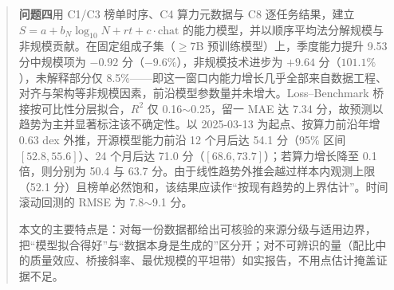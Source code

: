 \documentclass[bwprint]{gmcmthesis}
\begin{document}
\begin{abstract}
\textbf{问题四}用 C1/C3 榜单时序、C4 算力元数据与 C8 逐任务结果，建立 $S=a+b_N\log_{10}N+rt+c\cdot\text{chat}$ 的能力模型，并以顺序平均法分解规模与非规模贡献。在固定组成子集（$\ge$7B 预训练模型）上，季度能力提升 9.53 分中规模项为 $-0.92$ 分（$-9.6\%$），非规模技术进步为 $+9.64$ 分（$101.1\%$），未解释部分仅 8.5\%——即这一窗口内能力增长几乎全部来自数据工程、对齐与架构等非规模因素，前沿模型参数量并未增大。Loss--Benchmark 桥接按可比性分层拟合，$R^2$ 仅 0.16$\sim$0.25，留一 MAE 达 7.34 分，故预测以趋势为主并显著标注该不确定性。以 2025-03-13 为起点、按算力前沿年增 0.63 dex 外推，开源模型能力前沿 12 个月后达 54.1 分（95\% 区间 $[52.8,55.6]$）、24 个月后达 71.0 分（$[68.6,73.7]$）；若算力增长降至 0.1 倍，则分别为 50.4 与 63.7 分。由于线性趋势外推会越过样本内观测上限（52.1 分）且榜单必然饱和，该结果应读作``按现有趋势的上界估计''。时间滚动回测的 RMSE 为 7.8$\sim$9.1 分。

本文的主要特点是：对每一份数据都给出可核验的来源分级与适用边界，把``模型拟合得好''与``数据本身是生成的''区分开；对不可辨识的量（配比中的质量效应、桥接斜率、最优规模的平坦带）如实报告，不用点估计掩盖证据不足。

\end{abstract}

\pagestyle{plain}











\end{document}
